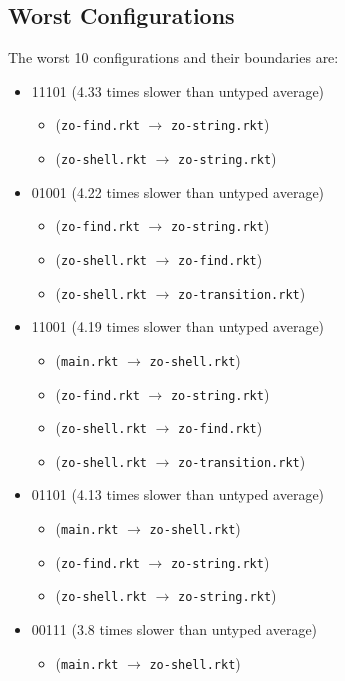 \documentclass{article}
\newcommand{\mono}[1]{\texttt{#1}}
\begin{document}
\subsection{Worst Configurations}
The worst 10 configurations and their boundaries are:
\begin{itemize}
\item 11101 (4.33 times slower than untyped average)
  \begin{itemize}
  \item (\mono{zo-find.rkt} $\rightarrow$ \mono{zo-string.rkt})
  \item (\mono{zo-shell.rkt} $\rightarrow$ \mono{zo-string.rkt})
  \end{itemize}
\item 01001 (4.22 times slower than untyped average)
  \begin{itemize}
  \item (\mono{zo-find.rkt} $\rightarrow$ \mono{zo-string.rkt})
  \item (\mono{zo-shell.rkt} $\rightarrow$ \mono{zo-find.rkt})
  \item (\mono{zo-shell.rkt} $\rightarrow$ \mono{zo-transition.rkt})
  \end{itemize}
\item 11001 (4.19 times slower than untyped average)
  \begin{itemize}
  \item (\mono{main.rkt} $\rightarrow$ \mono{zo-shell.rkt})
  \item (\mono{zo-find.rkt} $\rightarrow$ \mono{zo-string.rkt})
  \item (\mono{zo-shell.rkt} $\rightarrow$ \mono{zo-find.rkt})
  \item (\mono{zo-shell.rkt} $\rightarrow$ \mono{zo-transition.rkt})
  \end{itemize}
\item 01101 (4.13 times slower than untyped average)
  \begin{itemize}
  \item (\mono{main.rkt} $\rightarrow$ \mono{zo-shell.rkt})
  \item (\mono{zo-find.rkt} $\rightarrow$ \mono{zo-string.rkt})
  \item (\mono{zo-shell.rkt} $\rightarrow$ \mono{zo-string.rkt})
  \end{itemize}
\item 00111 (3.8 times slower than untyped average)
  \begin{itemize}
  \item (\mono{main.rkt} $\rightarrow$ \mono{zo-shell.rkt})

\end{itemize}
\end{itemize}
\end{document}
